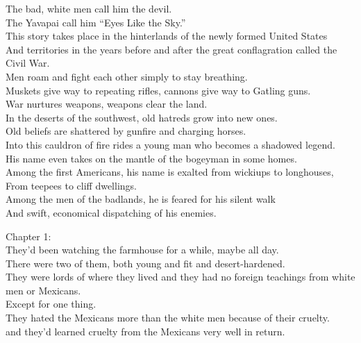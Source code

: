 \label{album:eyes-like-the-sky}




The bad, white men call him the devil. \\
The Yavapai call him ``Eyes Like the Sky.'' \\

This story takes place in the hinterlands of the newly formed United States \\
And territories in the years before and after the great conflagration called the Civil War. \\
Men roam and fight each other simply to stay breathing. \\
Muskets give way to repeating rifles, cannons give way to Gatling guns. \\
War nurtures weapons, weapons clear the land. \\

In the deserts of the southwest, old hatreds grow into new ones. \\
Old beliefs are shattered by gunfire and charging horses. \\
Into this cauldron of fire rides a young man who becomes a shadowed legend. \\
His name even takes on the mantle of the bogeyman in some homes. \\

Among the first Americans, his name is exalted from wickiups to longhouses, \\
From teepees to cliff dwellings. \\
Among the men of the badlands, he is feared for his silent walk \\
And swift, economical dispatching of his enemies. \\




Chapter 1: \\

They'd been watching the farmhouse for a while, maybe all day. \\
There were two of them, both young and fit and desert-hardened. \\
They were lords of where they lived and they had no foreign teachings from white men or Mexicans. \\
Except for one thing. \\
They hated the Mexicans more than the white men because of their cruelty. \\
and they'd learned cruelty from the Mexicans very well in return. \\

